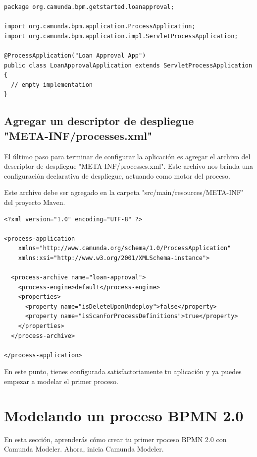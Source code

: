\documentclass{article}
\begin{document}
\begin{verbatim}
package org.camunda.bpm.getstarted.loanapproval;

import org.camunda.bpm.application.ProcessApplication;
import org.camunda.bpm.application.impl.ServletProcessApplication;

@ProcessApplication("Loan Approval App")
public class LoanApprovalApplication extends ServletProcessApplication {
  // empty implementation
}
\end{verbatim}

\newpage
\subsection{Agregar un descriptor de despliegue \\"META-INF/processes.xml"}

El último paso para terminar de configurar la aplicación es agregar el archivo del descriptor de despliegue "META-INF/processes.xml". Este archivo nos brinda una configuración declarativa de despliegue, actuando como motor del proceso.

Este archivo debe ser agregado en la carpeta "src/main/resources/META-INF" del proyecto Maven.

\begin{verbatim}
<?xml version="1.0" encoding="UTF-8" ?>

<process-application
    xmlns="http://www.camunda.org/schema/1.0/ProcessApplication"
    xmlns:xsi="http://www.w3.org/2001/XMLSchema-instance">

  <process-archive name="loan-approval">
    <process-engine>default</process-engine>
    <properties>
      <property name="isDeleteUponUndeploy">false</property>
      <property name="isScanForProcessDefinitions">true</property>
    </properties>
  </process-archive>

</process-application>
\end{verbatim}

En este punto, tienes configurada satisfactoriamente tu aplicación y ya puedes empezar a modelar el primer proceso.

\newpage

\section{Modelando un proceso BPMN 2.0}

En esta sección, aprenderás cómo crear tu primer rpoceso BPMN 2.0 con Camunda Modeler. Ahora, inicia Camunda Modeler.
\end{document}
